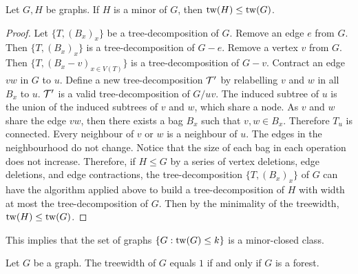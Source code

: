 \begin{proposition}\label{thm:tw_minor_closure}
	Let $G, H$ be graphs. If \(H\) is a minor of \(G\), then \(\operatorname{tw}(H) \leq \operatorname{tw}(G)\).
\end{proposition}
\begin{proof}
	Let \( \{T, {(B_x)}_{x} \} \) be a tree-decomposition of \(G\). Remove an edge $e$ from $G$. Then \( \{T, {(B_x)}_{x} \} \) is a tree-decomposition of $G - e$. Remove a vertex $v$ from $G$. Then \( \{ T, {(B_x - v)}_{x \in V(T)} \} \) is a tree-decomposition of $G - v$. Contract an edge $vw$ in $G$ to $u$. Define a new tree-decomposition $\mathcal{T}'$ by relabelling \(v\) and \(w\) in all $B_x$ to \(u\). $\mathcal{T}'$ is a valid tree-decomposition of $G / uv$. The induced subtree of \(u\) is the union of the induced subtrees of \(v\) and \(w\), which share a node. As $v$ and $w$ share the edge $vw$, then there exists a bag $B_x$ such that $v, w \in B_x$. Therefore $T_u$ is connected. Every neighbour of \(v\) or \(w\) is a neighbour of \(u\). The edges in the neighbourhood do not change. Notice that the size of each bag in each operation does not increase. Therefore, if $H \leq G$ by a series of vertex deletions, edge deletions, and edge contractions, the tree-decomposition \( \{T, {(B_x)}_{x} \} \) of $G$ can have the algorithm applied above to build a tree-decomposition of $H$ with width at most the tree-decomposition of $G$. Then by the minimality of the treewidth, \(\operatorname{tw}(H) \leq \operatorname{tw}(G)\). 
\end{proof}

This implies that the set of graphs $\left\{G : \operatorname{tw}(G) \leq k\right\}$ is a minor-closed class. 

\begin{proposition}\label{lem:treewidth_forest}
	Let $G$ be a graph. The treewidth of $G$ equals $1$ if and only if \(G\) is a forest.
\end{proposition}

